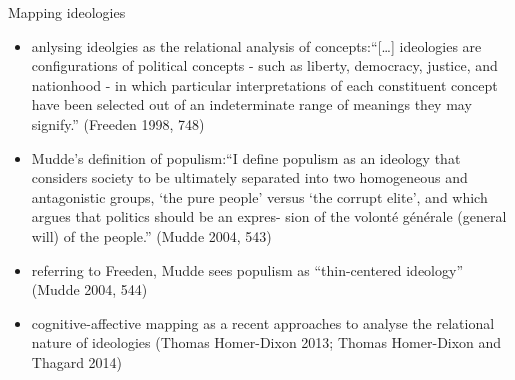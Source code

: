 \documentclass[
  ignorenonframetext,
]{beamer}
\begin{document}
\begin{frame}{Mapping ideologies}
\protect\hypertarget{mapping-ideologies}{}

\begin{itemize}
\item
  anlysing ideolgies as the relational analysis of
  concepts:``{[}\ldots{}{]} ideologies are configurations of political
  concepts - such as liberty, democracy, justice, and nationhood - in
  which particular interpretations of each constituent concept have been
  selected out of an indeterminate range of meanings they may signify.''
  (Freeden 1998, 748)
\item
  Mudde's definition of populism:``I define populism as an ideology that
  considers society to be ultimately separated into two homogeneous and
  antagonistic groups, `the pure people' versus `the corrupt elite', and
  which argues that politics should be an expres- sion of the volonté
  générale (general will) of the people.'' (Mudde 2004, 543)
\item
  referring to Freeden, Mudde sees populism as ``thin-centered
  ideology'' (Mudde 2004, 544)
\item
  cognitive-affective mapping as a recent approaches to analyse the
  relational nature of ideologies (Thomas Homer-Dixon 2013; Thomas
  Homer-Dixon and Thagard 2014)
\end{itemize}

\end{frame}
\end{document}
